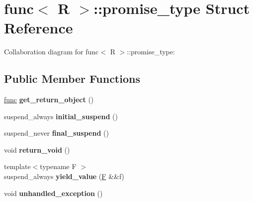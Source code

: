 \hypertarget{structfunc_1_1promise__type}{}\section{func$<$ R $>$\+:\+:promise\+\_\+type Struct Reference}
\label{structfunc_1_1promise__type}


Collaboration diagram for func$<$ R $>$\+:\+:promise\+\_\+type\+:
\subsection*{Public Member Functions}
\begin{DoxyCompactItemize}
\item 
\mbox{\label{structfunc_1_1promise__type_ab72a984e5949fb8db26bdde859c3620e}} 
\mbox{\hyperlink{structfunc}{func}} {\bfseries get\+\_\+return\+\_\+object} ()
\item 
\mbox{\label{structfunc_1_1promise__type_aa0d457a25e41acdf83c404ae0876d3d1}} 
suspend\+\_\+always {\bfseries initial\+\_\+suspend} ()
\item 
\mbox{\label{structfunc_1_1promise__type_acdba3306222ea441f4d7b966030bbd02}} 
suspend\+\_\+never {\bfseries final\+\_\+suspend} ()
\item 
\mbox{\label{structfunc_1_1promise__type_abf8955817dcb13b79ea6d3cff1a39d18}} 
void {\bfseries return\+\_\+void} ()
\item 
\mbox{\label{structfunc_1_1promise__type_a0e1b4e9cfa256f3d2ffdea5f7d2af8b5}} 
{\footnotesize template$<$typename F $>$ }\\suspend\+\_\+always {\bfseries yield\+\_\+value} (\mbox{\hyperlink{struct_f}{F}} \&\&f)
\item 
\mbox{\label{structfunc_1_1promise__type_aef00667082cfe2a22df5f686f1017ab0}} 
void {\bfseries unhandled\+\_\+exception} ()
\item 
\mbox{\label{structfunc_1_1promise__type_ab72a984e5949fb8db26bdde859c3620e}} 

\end{DoxyCompactItemize}
